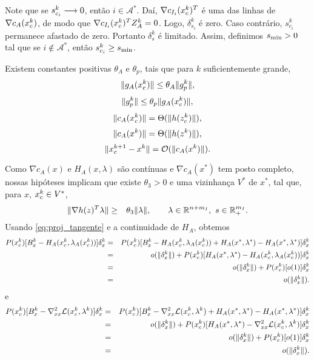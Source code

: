 Note que se $s_{c_i}^k \longrightarrow 0$, então $i \in \mathcal{A}^*$. Daí, $\nabla
c_{I_i}(x_c^{k})^T$ é
uma das linhas de $\nabla c_A(x_c^{k})$, de modo que $\nabla c_{I_i}(x_c^{k})^T Z_A^k = 0$.
Logo, $\delta_{s_i}^k$ é zero. Caso contrário, $s_{c_i}^k$ permanece afastado de
zero. Portanto $\delta_s^k$ é limitado. Assim, definimos
 $s_{\min} > 0$ tal que se $i \not\in \mathcal{A}^*$, então $s_{c_i}^k \geq s_{\min}$.
\begin{hypoenv}
 Existem constantes positivas $\theta_A$ e $\theta_p$, tais que para $k$
 suficientemente grande, 
$$\Vert g_A(x_c^{k})\Vert \leq \theta_A\Vert g_p^{k}\Vert,$$ 
$$\Vert g_p^{k}\Vert \leq \theta_p\Vert g_A(x_c^{k})\Vert,$$ 
$$\Vert c_A(x_c^{k})\Vert = \Theta(\Vert h(z_c^{k})\Vert),$$
$$\Vert c_A(x^{k})\Vert = \Theta(\Vert h(z^{k})\Vert),$$
$$\Vert x_c^{k+1} - x^k\Vert = \mathcal{O}(\Vert c_A(x^k)\Vert).$$
\end{hypoenv}

Como $\nabla c_A(x)$ e $H_A(x,\lambda)$ são contínuas e $\nabla c_A(x^*)$ tem
posto completo, nossas hipóteses implicam que existe $\theta_3 > 0$ e uma
vizinhança $V^*$ de $x^*$, tal que, para $x$, $x_c^{k} \in V^*$,
\begin{eqnarray}
\norma{\nabla h(z)^T\lambda} & \geq & \theta_3\norma{\lambda}, \qquad \lambda \in \Rn{n+m_I},
\ s \in \Rn{m_I}_+. \visiblelbl{eq:svd}
\end{eqnarray}
Usando \eqref{eq:proj_tangente} e a continuidade de $H_A$, obtemos
\begin{eqnarray}
P(\xc{k})[B_x^k - H_A(\xc{k},\lA(\xc{k}))]\delta_x^k & = &
 P(\xc{k})[B_x^k - H_A(\xc{k},\lA(\xc{k})) + H_A(x^*,\lk{*}) - H_A(x^*,\lk{*})] 
\delta_x^k \nonumber \\
& = & o(\norma{\delta_x^k}) + P(\xc{k})[H_A(x^*,\lk{*}) - H_A(\xc{k},\lA(\xc{k}))]\delta_x^k
\nonumber \\
& = & o(\norma{\delta_x^k}) + P(\xc{k})[o(1)]\delta_x^k \nonumber \\
& = & o(\norma{\delta_x^k}). \visiblelbl{eq:PBWlls}
\end{eqnarray}
e
\begin{eqnarray}
P(\xc{k})[B_x^k - \nabla_{xx}^2 \mathcal{L}(\xc{k},\lk{k})]\delta_x^k & = &
P(\xc{k})[B_x^k - \nabla_{xx}^2 \mathcal{L}(\xc{k},\lk{k}) + H_A(x^*,\lk{*}) - H_A(x^*,\lk{*})]
\delta_x^k \nonumber \\
& = & o(\norma{\delta_x^k}) + P(\xc{k})[H_A(x^*,\lk{*}) - \nabla_{xx}^2 
\mathcal{L}(\xc{k},\lk{k})]\delta_x^k \nonumber \\
& = & o(\norma{\delta_x^k}) + P(\xc{k})[o(1)]\delta_x^k \nonumber \\
& = & o(\norma{\delta_x^k}). \visiblelbl{eq:PBWlk}
\end{eqnarray}

